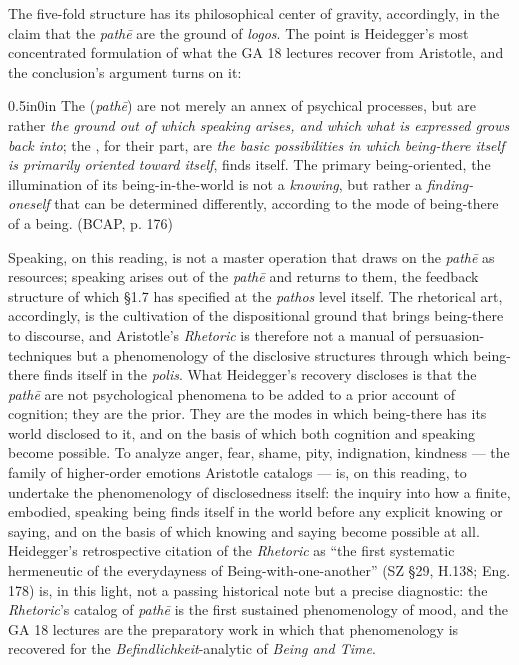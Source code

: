 The five-fold structure has its philosophical center of gravity, accordingly, in the claim that the \textit{pathē} are the ground of \textit{logos}. The point is Heidegger's most concentrated formulation of what the GA 18 lectures recover from Aristotle, and the conclusion's argument turns on it:

\begin{adjustwidth}{0.5in}{0in}
The  (\textit{pathē}) are not merely an annex of psychical processes, but are rather \textit{the ground out of which speaking arises, and which what is expressed grows back into}; the , for their part, are \textit{the basic possibilities in which being-there itself is primarily oriented toward itself}, finds itself. The primary being-oriented, the illumination of its being-in-the-world is not a \textit{knowing}, but rather a \textit{finding-oneself} that can be determined differently, according to the mode of being-there of a being. (BCAP, p. 176)
\end{adjustwidth}

Speaking, on this reading, is not a master operation that draws on the \textit{pathē} as resources; speaking arises out of the \textit{pathē} and returns to them, the feedback structure of which \S1.7 has specified at the \textit{pathos} level itself. The rhetorical art, accordingly, is the cultivation of the dispositional ground that brings being-there to discourse, and Aristotle's \textit{Rhetoric} is therefore not a manual of persuasion-techniques but a phenomenology of the disclosive structures through which being-there finds itself in the \textit{polis}. What Heidegger's recovery discloses is that the \textit{pathē} are not psychological phenomena to be added to a prior account of cognition; they are the prior. They are the modes in which being-there has its world disclosed to it, and on the basis of which both cognition and speaking become possible. To analyze anger, fear, shame, pity, indignation, kindness --- the family of higher-order emotions Aristotle catalogs --- is, on this reading, to undertake the phenomenology of disclosedness itself: the inquiry into how a finite, embodied, speaking being finds itself in the world before any explicit knowing or saying, and on the basis of which knowing and saying become possible at all. Heidegger's retrospective citation of the \textit{Rhetoric} as ``the first systematic hermeneutic of the everydayness of Being-with-one-another'' (SZ \S29, H.138; Eng. 178) is, in this light, not a passing historical note but a precise diagnostic: the \textit{Rhetoric}'s catalog of \textit{pathē} is the first sustained phenomenology of mood, and the GA 18 lectures are the preparatory work in which that phenomenology is recovered for the \textit{Befindlichkeit}-analytic of \textit{Being and Time}.

